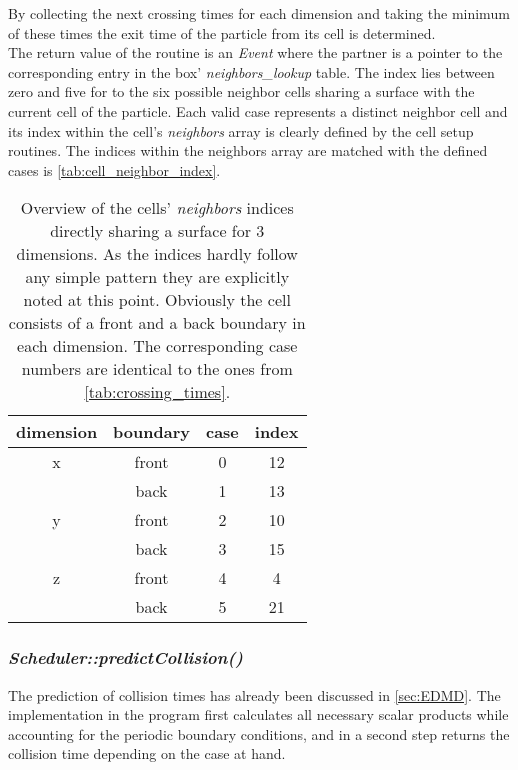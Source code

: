 By collecting the next crossing times for each dimension and taking the minimum of these times the exit time of the particle from its cell is determined.\\

The return value of the routine is an \textit{Event} where the partner is a pointer to the corresponding entry in the box' \textit{neighbors\_lookup} table. The index lies between zero and five for to the six possible neighbor cells sharing a surface with the current cell of the particle. Each valid case represents a distinct neighbor cell and its index within the cell's \textit{neighbors} array is clearly defined by the cell setup routines. The indices within the neighbors array are matched with the defined cases is \autoref{tab:cell_neighbor_index}. 

\begin{table}[h]
\centering
\begin{tabular}{c|c|c|c}
dimension & boundary & case & index \\ \hline
x & front & 0 & 12 \\
 & back & 1 & 13 \\ \hline
y & front & 2 & 10 \\
 & back & 3 & 15 \\ \hline
z & front & 4 & 4 \\
 & back & 5 & 21 \\
\end{tabular}
\caption[Lookup table of cell neighbor indices]{Overview of the cells' \textit{neighbors} indices directly sharing a surface for 3 dimensions. As the indices hardly follow any simple pattern they are explicitly noted at this point. Obviously the cell consists of a front and a back boundary in each dimension. The corresponding case numbers are identical to the ones from \autoref{tab:crossing_times}.}
\label{tab:cell_neighbor_index}
\end{table}
\FloatBarrier

\subsubsection{\quad \textit{Scheduler::predictCollision()}}
The prediction of collision times has already been discussed in \autoref{sec:EDMD}. The implementation in the program first calculates all necessary scalar products while accounting for the periodic boundary conditions, and in a second step returns the collision time depending on the case at hand.\\

